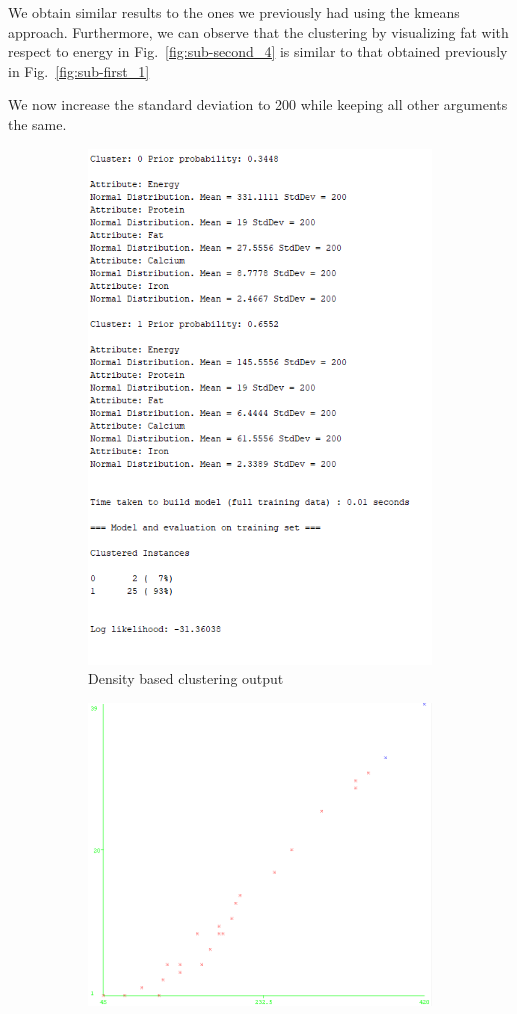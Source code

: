 \documentclass[letterpaper,12pt]{article}
\begin{document}
We obtain similar results to the ones we previously had using the kmeans approach. Furthermore, we can observe that the clustering by visualizing fat with respect to energy in Fig.~\ref{fig:sub-second_4} is similar to that obtained previously in Fig.~\ref{fig:sub-first_1}


We now increase the standard deviation to 200 while keeping all other arguments the same.

\begin{figure}[H]
\begin{subfigure}{.4\textwidth}
  \centering
  \includegraphics[width=.8\linewidth]{density_seed10_cl2_dev200}  
  \caption{Density based clustering output}
  \label{fig:sub-first_4}
\end{subfigure}
\begin{subfigure}{.4\textwidth}
  \centering
  \includegraphics[width=.8\linewidth]{density_200_energy_fat}  

\end{subfigure}
\end{figure}
\end{document}
